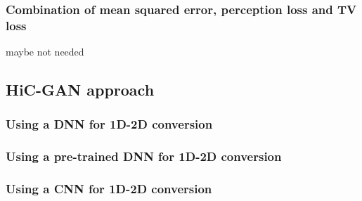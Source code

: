 \subsubsection{Combination of mean squared error, perception loss and TV loss}
maybe not needed

\subsection{HiC-GAN approach}
\subsubsection{Using a DNN for 1D-2D conversion}
\subsubsection{Using a pre-trained DNN for 1D-2D conversion}
\subsubsection{Using a CNN for 1D-2D conversion}









